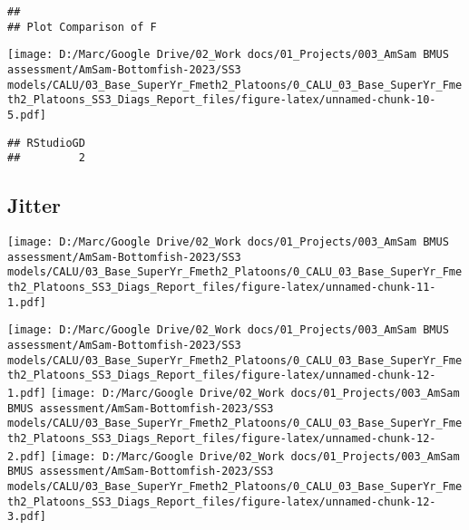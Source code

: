 \documentclass[
]{article}
\begin{document}
\begin{verbatim}
## 
## Plot Comparison of F
\end{verbatim}

\texttt{[image: D:/Marc/Google Drive/02\_Work docs/01\_Projects/003\_AmSam BMUS assessment/AmSam-Bottomfish-2023/SS3 models/CALU/03\_Base\_SuperYr\_Fmeth2\_Platoons/0\_CALU\_03\_Base\_SuperYr\_Fmeth2\_Platoons\_SS3\_Diags\_Report\_files/figure-latex/unnamed-chunk-10-5.pdf]}

\begin{verbatim}
## RStudioGD 
##         2
\end{verbatim}

\hypertarget{jitter}{%
\subsection{Jitter}\label{jitter}}

\texttt{[image: D:/Marc/Google Drive/02\_Work docs/01\_Projects/003\_AmSam BMUS assessment/AmSam-Bottomfish-2023/SS3 models/CALU/03\_Base\_SuperYr\_Fmeth2\_Platoons/0\_CALU\_03\_Base\_SuperYr\_Fmeth2\_Platoons\_SS3\_Diags\_Report\_files/figure-latex/unnamed-chunk-11-1.pdf]}

\texttt{[image: D:/Marc/Google Drive/02\_Work docs/01\_Projects/003\_AmSam BMUS assessment/AmSam-Bottomfish-2023/SS3 models/CALU/03\_Base\_SuperYr\_Fmeth2\_Platoons/0\_CALU\_03\_Base\_SuperYr\_Fmeth2\_Platoons\_SS3\_Diags\_Report\_files/figure-latex/unnamed-chunk-12-1.pdf]}
\texttt{[image: D:/Marc/Google Drive/02\_Work docs/01\_Projects/003\_AmSam BMUS assessment/AmSam-Bottomfish-2023/SS3 models/CALU/03\_Base\_SuperYr\_Fmeth2\_Platoons/0\_CALU\_03\_Base\_SuperYr\_Fmeth2\_Platoons\_SS3\_Diags\_Report\_files/figure-latex/unnamed-chunk-12-2.pdf]}
\texttt{[image: D:/Marc/Google Drive/02\_Work docs/01\_Projects/003\_AmSam BMUS assessment/AmSam-Bottomfish-2023/SS3 models/CALU/03\_Base\_SuperYr\_Fmeth2\_Platoons/0\_CALU\_03\_Base\_SuperYr\_Fmeth2\_Platoons\_SS3\_Diags\_Report\_files/figure-latex/unnamed-chunk-12-3.pdf]}

\hypertarget{section}{%
\subsection{}\label{section}}
\end{document}
